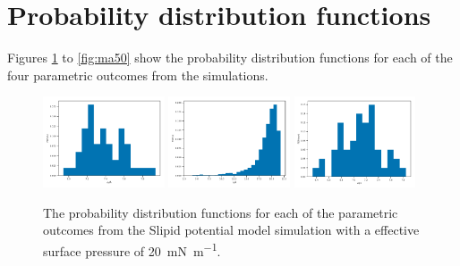 \documentclass[amsmath,amssymb,superscriptaddress]{revtex4-1}
\begin{document}
\section{Probability distribution functions}
Figures \ref{fig:sl20} to \ref{fig:ma50} show the probability distribution functions for each of the four parametric outcomes from the simulations.
%
\begin{figure}
 \centering
 \includegraphics[width=0.32\textwidth]{slipids_20_dh}
 \includegraphics[width=0.32\textwidth]{slipids_20_tt}
 \includegraphics[width=0.32\textwidth]{slipids_20_wph}
 \caption{The probability distribution functions for each of the parametric outcomes from the Slipid potential model simulation with a effective surface pressure of \SI{20}{\milli\newton\per\meter}.}
 \label{fig:sl20}
\end{figure}
%
%
\end{document}
